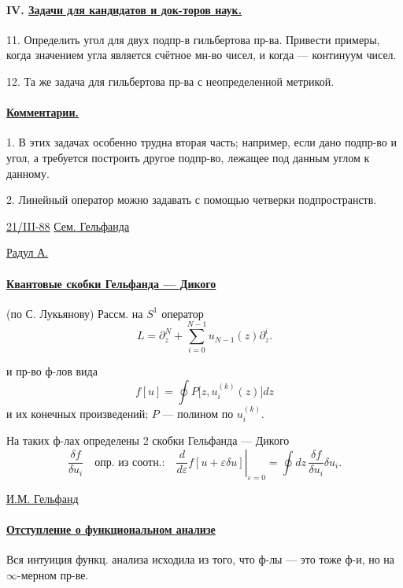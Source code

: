 \paragraph*{IV. \underline{Задачи для кандидатов и док-торов наук.}}
11. Определить угол для двух подпр-в гильбертова пр-ва.
Привести примеры, когда значением угла является счётное
мн-во чисел, и когда — континуум чисел.

12. Та же задача для гильбертова пр-ва с неопределенной метрикой.

\paragraph*{\underline{Комментарии.}}
1. В этих задачах особенно трудна вторая часть; например,
если дано подпр-во и угол, а требуется построить
другое подпр-во, лежащее под данным углом к данному.

2. Линейный оператор можно задавать с помощью
четверки подпространств.


\underline{21/III-88} \qquad \underline{Сем. Гельфанда}

\underline{\underline{Радул А.}}

\paragraph*{\underline{Квантовые скобки Гельфанда — Дикого}}
(по С. Лукьянову) \qquad Рассм. на $S^1$ оператор
\begin{equation*}
L=\partial_z^N+\sum_{i=0}^{N-1}u_{N-1}(z)\partial_z^i . \tag{1}
\end{equation*}

и пр-во ф-лов вида
\begin{equation*}
f[u]=\oint P\bigl[z,u_i^{(k)}(z)\bigr]dz \tag{2}
\end{equation*}
и их конечных произведений; $P$ — полином по $u_i^{(k)}$.

На таких ф-лах определены 2 скобки Гельфанда — Дикого
\begin{equation*}
\frac{\delta f}{\delta u_i}\quad
\text{опр. из соотн.:}\quad
\left.\frac{d}{d\varepsilon}f[u+\varepsilon\delta u]\right|_{\varepsilon=0}
=\oint dz\,\frac{\delta f}{\delta u_i}\delta u_i . \tag{3}
\end{equation*}

\underline{И.М. Гельфанд}
\paragraph*{\underline{Отступление о функциональном анализе}}
Вся интуиция функц. анализа исходила из того, что ф-лы — это тоже
ф-и, но на $\infty$-мерном пр-ве.

